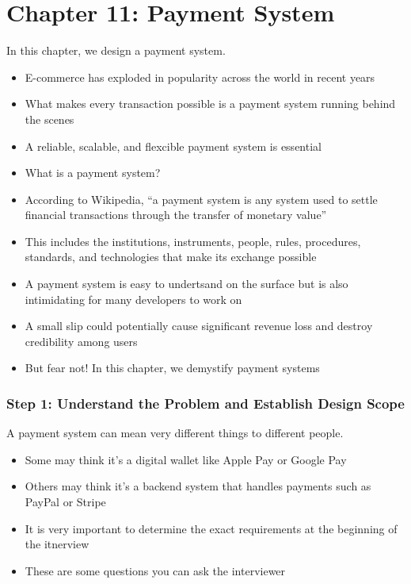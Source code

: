 \documentclass{report}
\theoremstyle{definition}
\let\oldsubsection\subsection
\renewcommand{\subsection}{\oldsubsection*}
\begin{document}
\chapter*{Chapter 11: Payment System}

In this chapter, we design a payment system.

\begin{itemize}
\item
E-commerce has exploded in popularity across the world in recent years
\item
What makes every transaction possible is a payment system running behind the scenes
\item
A reliable, scalable, and flexcible payment system is essential
\item
What is a payment system?
\item
According to Wikipedia, ``a payment system is any system used to settle financial transactions through the transfer of monetary value''
\item
This includes the institutions, instruments, people, rules, procedures, standards, and technologies that make its exchange possible
\item
A payment system is easy to undertsand on the surface but is also intimidating for many developers to work on
\item
A small slip could potentially cause significant revenue loss and destroy credibility among users
\item
But fear not! In this chapter, we demystify payment systems
\end{itemize}

\subsection{Step 1: Understand the Problem and Establish Design Scope}

A payment system can mean very different things to different people.

\begin{itemize}
\item
Some may think it's a digital wallet like Apple Pay or Google Pay
\item
Others may think it's a backend system that handles payments such as PayPal or Stripe
\item
It is very important to determine the exact requirements at the beginning of the itnerview
\item
These are some questions you can ask the interviewer
\end{itemize}
\end{document}
